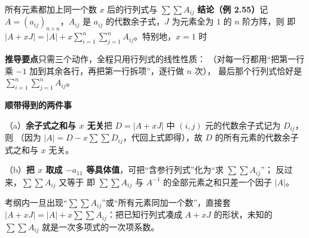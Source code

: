 \begin{fdeep}{所有元素都加上同一个数 $x$ 后的行列式与 $\sum\sum A_{ij}$}
\textbf{结论（例 2.55）}\quad 记 $A=(a_{ij})_{n\times n}$，$A_{ij}$ 是 $a_{ij}$ 的代数余子式，$J$ 为元素全为 $1$ 的 $n$ 阶方阵，则
即 $|A+xJ|=|A|+x\sum\limits_{i=1}^{n}\sum\limits_{j=1}^{n}A_{ij}$。特别地，$x=1$ 时

\textbf{推导要点}\quad 只需三个动作，全程只用行列式的线性性质：
（对每一行都用“把第一行乘 $-1$ 加到其余各行，再把第一行拆项”，逐行做 $n$ 次），
最后那个行列式恰好是 $\sum\limits_{i=1}^{n}\sum\limits_{j=1}^{n}A_{ij}$。

\textbf{顺带得到的两件事}

（a）\textbf{余子式之和与 $x$ 无关}\quad 把 $D=|A+xJ|$ 中 $(i,j)$ 元的代数余子式记为 $D_{ij}$，则
（因为 $|A|=D-x\sum\sum D_{ij}$，代回上式即得），故 $D$ 的所有元素的代数余子式之和与 $x$ 无关。

（b）\textbf{把 $x$ 取成 $-a_{11}$ 等具体值}，可把“含参行列式”化为“求 $\sum\sum A_{ij}$”；
反过来，$\sum\sum A_{ij}$ 又等于
即 $\sum\sum A_{ij}$ 与 $A^{-1}$ 的全部元素之和只差一个因子 $|A|$。

\textbf{\fbref{}}考纲内一旦出现“$\sum\sum A_{ij}$”或“所有元素同加一个数”，直接套 $|A+xJ|=|A|+x\sum\sum A_{ij}$：把已知行列式凑成 $A+xJ$ 的形状，未知的 $\sum\sum A_{ij}$ 就是一次多项式的一次项系数。
\end{fdeep}

